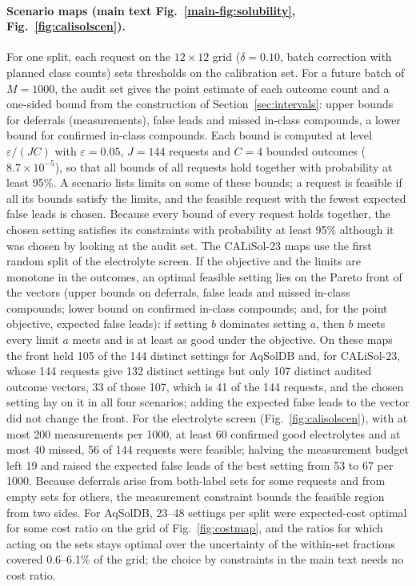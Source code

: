 \documentclass[10pt]{article}
\begin{document}
\paragraph{Scenario maps (main text Fig.~\ref{main-fig:solubility}, Fig.~\ref{fig:calisolscen}).} For one split, each request on the $12\times12$ grid ($\delta=0.10$, batch correction with planned class counts) sets thresholds on the calibration set. For a future batch of $M=1000$, the audit set gives the point estimate of each outcome count and a one-sided bound from the construction of Section~\ref{sec:intervals}: upper bounds for deferrals (measurements), false leads and missed in-class compounds, a lower bound for confirmed in-class compounds. Each bound is computed at level $\varepsilon/(JC)$ with $\varepsilon=0.05$, $J=144$ requests and $C=4$ bounded outcomes ($8.7\times10^{-5}$), so that all bounds of all requests hold together with probability at least 95\%. A scenario lists limits on some of these bounds; a request is feasible if all its bounds satisfy the limits, and the feasible request with the fewest expected false leads is chosen. Because every bound of every request holds together, the chosen setting satisfies its constraints with probability at least 95\% although it was chosen by looking at the audit set. The CALiSol-23 maps use the first random split of the electrolyte screen. If the objective and the limits are monotone in the outcomes, an optimal feasible setting lies on the Pareto front of the vectors (upper bounds on deferrals, false leads and missed in-class compounds; lower bound on confirmed in-class compounds; and, for the point objective, expected false leads): if setting $b$ dominates setting $a$, then $b$ meets every limit $a$ meets and is at least as good under the objective. On these maps the front held 105 of the 144 distinct settings for AqSolDB and, for CALiSol-23, whose 144 requests give 132 distinct settings but only 107 distinct audited outcome vectors, 33 of those 107, which is 41 of the 144 requests, and the chosen setting lay on it in all four scenarios; adding the expected false leads to the vector did not change the front. For the electrolyte screen (Fig.~\ref{fig:calisolscen}), with at most 200 measurements per 1000, at least 60 confirmed good electrolytes and at most 40 missed, 56 of 144 requests were feasible; halving the measurement budget left 19 and raised the expected false leads of the best setting from 53 to 67 per 1000. Because deferrals arise from both-label sets for some requests and from empty sets for others, the measurement constraint bounds the feasible region from two sides. For AqSolDB, 23--48 settings per split were expected-cost optimal for some cost ratio on the grid of Fig.~\ref{fig:costmap}, and the ratios for which acting on the sets stays optimal over the uncertainty of the within-set fractions covered 0.6--6.1\% of the grid; the choice by constraints in the main text needs no cost ratio.
\end{document}
